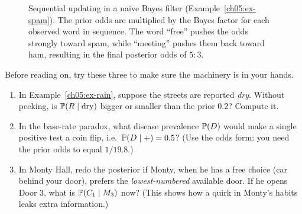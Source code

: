 \begin{figure}[htbp]
\centering
{}
\caption{Sequential updating in a naive Bayes filter (Example~\ref{ch05:ex-spam}). The prior odds are multiplied by the Bayes factor for each observed word in sequence. The word ``free'' pushes the odds strongly toward spam, while ``meeting'' pushes them back toward ham, resulting in the final posterior odds of $5{:}3$.}
\label{ch05:fig-spam-pipeline}
\end{figure}

\begin{labbox}
Before reading on, try these three to make sure the machinery is in your hands.
\begin{enumerate}
\item In Example~\ref{ch05:ex-rain}, suppose the streets are reported \emph{dry}. Without
peeking, is $\P(R \given \text{dry})$ bigger or smaller than the prior $0.2$? Compute it.
\item In the base-rate paradox, what disease prevalence $\P(D)$ would make a single
positive test a coin flip, i.e.\ $\P(D\given +)=0.5$? (Use the odds form: you need the
prior odds to equal $1/19.8$.)
\item In Monty Hall, redo the posterior if Monty, when he has a free choice (car behind
your door), prefers the \emph{lowest-numbered} available door. If he opens Door $3$, what
is $\P(C_1\given M_3)$ now? (This shows how a quirk in Monty's habits leaks extra
information.)
\end{enumerate}
\end{labbox}

